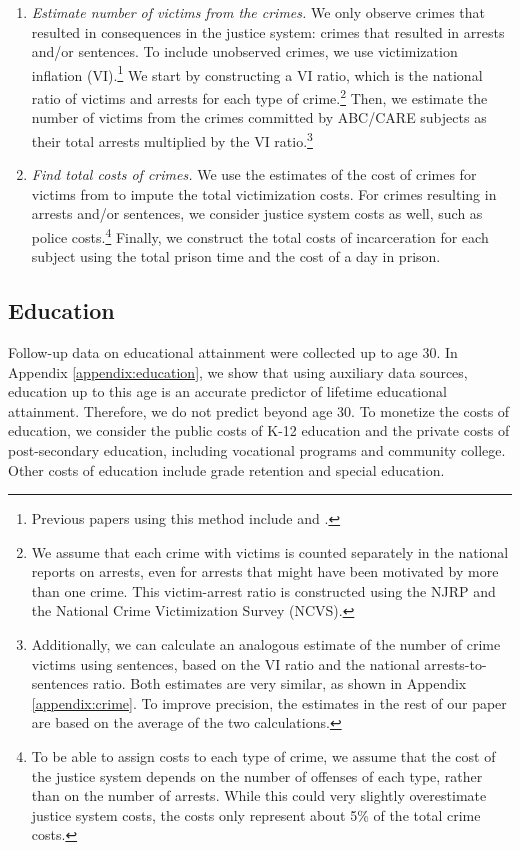 \begin{enumerate}
\item \textit{Estimate number of victims from the crimes.} We only observe crimes that resulted in consequences in the justice system: crimes that resulted in arrests and/or sentences. To include unobserved crimes, we use victimization inflation (VI).\footnote{Previous papers using this method include \citet{Belfield_Nores_etal_2006_JHR} and \cite{Heckman_Moon_etal_2010_RateofReturn}.} We start by constructing a VI ratio, which is the national ratio of victims and arrests for each type of crime.\footnote{We assume that each crime with victims is counted separately in the national reports on arrests, even for arrests that might have been motivated by more than one crime. This victim-arrest ratio is constructed using the NJRP and the National Crime Victimization Survey (NCVS).} Then, we estimate the number of victims from the crimes committed by ABC/CARE subjects as their total arrests multiplied by the VI ratio.\footnote{Additionally, we can calculate an analogous estimate of the number of crime victims using sentences, based on the VI ratio and the national arrests-to-sentences ratio. Both estimates are very similar, as shown in Appendix \ref{appendix:crime}. To improve precision, the estimates in the rest of our paper are based on the average of the two calculations.}

\item \textit{Find total costs of crimes.} We use the estimates of the cost of crimes for victims from \cite{McCollister_etal_2010_DAD} to impute the total victimization costs. For crimes resulting in arrests and/or sentences, we consider justice system costs as well, such as police costs.\footnote{To be able to assign costs to each type of crime, we assume that the cost of the justice system depends on the number of offenses of each type, rather than on the number of arrests. While this could very slightly overestimate justice system costs, the costs only represent about 5\% of the total crime costs.} Finally, we construct the total costs of incarceration for each subject using the total prison time and the cost of a day in prison.
\end{enumerate}

\subsection{Education}

Follow-up data on educational attainment were collected up to age 30. In Appendix \ref{appendix:education}, we show that using auxiliary data sources, education up to this age is an accurate predictor of lifetime educational attainment. Therefore, we do not predict beyond age 30. To monetize the costs of education, we consider the public costs of K-12 education and the private costs of post-secondary education, including vocational programs and community college. Other costs of education include grade retention and special education.

